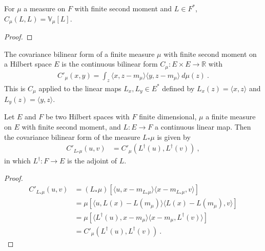 \begin{lemma}\label{lem:covarianceBilin_same_eq_variance}
  \mathlibok
For $\mu$ a measure on $F$ with finite second moment and $L \in F^*$, $C_\mu(L, L) = \mathbb{V}_\mu[L]$.
\end{lemma}

\begin{proof}
\end{proof}


\begin{definition}\label{def:covInnerBilin}
  \mathlibok
The covariance bilinear form of a finite measure $\mu$ with finite second moment on a Hilbert space $E$ is the continuous bilinear form $C_\mu : E \times E \to \mathbb{R}$ with
\begin{align*}
  C'_\mu(x, y) = \int_z \langle x, z - m_\mu \rangle \langle y, z - m_\mu \rangle \: d\mu(z) \: .
\end{align*}
This is $C_\mu$ applied to the linear maps $L_x, L_y \in E^*$ defined by $L_x(z) = \langle x, z \rangle$ and $L_y(z) = \langle y, z \rangle$.
\end{definition}


\begin{lemma}\label{lem:covInnerBilin_map}
  \mathlibok
Let $E$ and $F$ be two Hilbert spaces with $F$ finite dimensional, $\mu$ a finite measure on $E$ with finite second moment, and $L : E \to F$ a continuous linear map.
Then the covariance bilinear form of the measure $L_*\mu$ is given by
\begin{align*}
  C'_{L_*\mu}(u, v)
  &= C'_\mu(L^\dagger(u), L^\dagger(v))
  \: ,
\end{align*}
in which $L^\dagger : F \to E$ is the adjoint of $L$.
\end{lemma}

\begin{proof}\begin{align*}
  C'_{L_*\mu}(u, v)
  &= (L_*\mu)\left[\langle u, x - m_{L_*\mu}\rangle \langle x - m_{L_*\mu}, v \rangle\right]
  \\
  &= \mu\left[\langle u, L(x) - L(m_\mu)\rangle \langle L(x) - L(m_\mu), v \rangle \right]
  \\
  &= \mu\left[\langle L^\dagger(u), x - m_\mu\rangle \langle x - m_\mu, L^\dagger(v) \rangle \right]
  \\
  &= C'_\mu(L^\dagger(u), L^\dagger(v))
  \: .
\end{align*}
\end{proof}


